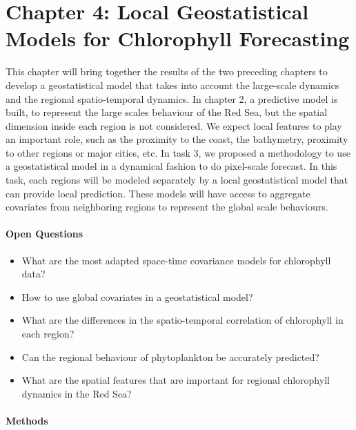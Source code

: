 \section{Chapter 4: Local Geostatistical Models for Chlorophyll Forecasting}

This chapter will bring together the results of the two preceding chapters to
develop a geostatistical model that takes into account the large-scale dynamics
and the regional spatio-temporal dynamics. In chapter 2, a predictive model is
built, to represent the large scales behaviour of the Red Sea, but the
spatial dimension inside each region is not considered. We expect local
features to play an important role, such as the proximity to the coast, the
bathymetry, proximity to other regions or major cities, etc. In task 3, we
proposed a methodology to use a geostatistical model in a dynamical fashion to
do pixel-scale forecast. In this task, each regions will be modeled separately
by a local geostatistical model that can provide local prediction. These models
will have access to aggregate covariates from neighboring regions to represent
the global scale behaviours. 

\paragraph{Open Questions}

\begin{itemize}

\item What are the most adapted space-time covariance models for chlorophyll
data?

\item How to use global covariates in a geostatistical model?

\item What are the differences in the spatio-temporal correlation of
chlorophyll in each region?

\item Can the regional behaviour of phytoplankton be accurately predicted?

\item What are the spatial features that are important for regional chlorophyll
dynamics in the Red Sea?

\end{itemize}

\paragraph{Methods}

